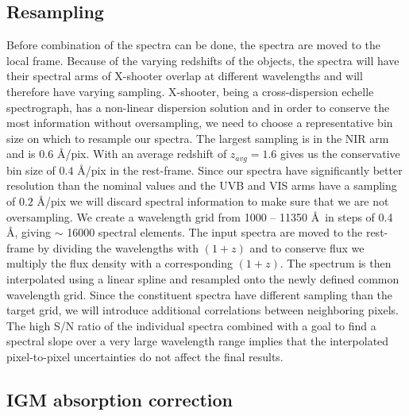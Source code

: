 \documentclass{aa}    %
\newcommand{\sectlabel}[1]{\label{sect:#1}}
\newcommand{\todo}[3]{{\color{#2}\emph{#1}: #3}}
\newcommand{\qtodo}[1]{\todo{Question}{red}{#1}}
\begin{document}
\subsection{Resampling} \sectlabel{rebin}

Before combination of the spectra can be done, the spectra are moved
to the local frame. Because of the varying redshifts of the objects,
the spectra will have their spectral arms of X-shooter overlap at
different wavelengths and will therefore have varying
sampling. X-shooter, being a cross-dispersion echelle spectrograph,
has a non-linear dispersion solution and in order to conserve the most
information without oversampling, we need to choose a representative
bin size on which to resample our spectra. The largest sampling is in
the NIR arm and is $0.6$ \AA/pix. With an average redshift of $z_{avg}
= 1.6$ gives us the conservative bin size of $0.4$ \AA/pix in the
rest-frame.  
Since our spectra have significantly better resolution than the
nominal values and the UVB and VIS arms have a sampling of $0.2$
\AA/pix we will discard spectral information to make sure that we are
not oversampling. We create a wavelength grid from 1000 -- 11350 \AA~in
steps of 0.4 \AA, giving $\sim$ 16000 spectral elements. The input spectra are moved to the rest-frame
by dividing the wavelengths with $(1 + z)$ and to conserve flux we
multiply the flux density with a corresponding $(1 + z)$. The spectrum
is then interpolated using a linear spline and
resampled onto the newly defined common wavelength grid. Since the
constituent spectra have different sampling than the target grid, we
will introduce additional correlations between neighboring
pixels. The high S/N ratio of the individual spectra combined with a goal to
find a spectral slope over a very large wavelength range implies that the
interpolated pixel-to-pixel uncertainties do not affect the final results.


\subsection{IGM absorption correction} \sectlabel{igm}
\end{document}
